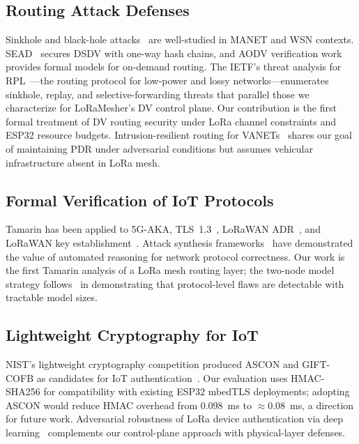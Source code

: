 \documentclass[10pt,journal,compsoc]{IEEEtran}
\begin{document}
\subsection{Routing Attack Defenses}

Sinkhole and black-hole attacks~\cite{sejaphala2025-sinkhole-detection,
ieee2025-blackhole-optimization,klenze2021-forwarding}
are well-studied in MANET and WSN contexts.
SEAD~\cite{hu2002-sead} secures DSDV with one-way hash chains,
and AODV verification work~\cite{glabbeek2016-aodv-verification}
provides formal models for on-demand routing.
The IETF's threat analysis for RPL~\cite{ietf-rfc7416}—the routing
protocol for low-power and lossy networks—enumerates sinkhole,
replay, and selective-forwarding threats that parallel those we
characterize for LoRaMesher's DV control plane.
Our contribution is the first formal treatment of DV routing
security under LoRa channel constraints and ESP32 resource budgets.
Intrusion-resilient routing for VANETs~\cite{springer2026-vanet-routing}
shares our goal of maintaining PDR under adversarial conditions
but assumes vehicular infrastructure absent in LoRa mesh.

\subsection{Formal Verification of IoT Protocols}

Tamarin has been applied to 5G-AKA, TLS~1.3~\cite{basin2025-tamarin-book},
LoRaWAN ADR~\cite{ieee2025-adr-eventb}, and LoRaWAN
key establishment~\cite{ieee2025-lorawan-key-verification}.
Attack synthesis frameworks~\cite{vonhippel2024-verification-attack,pereira2025-router-verification,song2026-protocolguard}
have demonstrated the value of automated reasoning for
network protocol correctness.
Our work is the first Tamarin analysis of a LoRa mesh routing
layer; the two-node model strategy follows~\cite{ieee2025-kang-tamarin,
shen2026-wifi-security} in demonstrating that
protocol-level flaws are detectable with tractable model sizes.

\subsection{Lightweight Cryptography for IoT}

NIST's lightweight cryptography competition produced ASCON and
GIFT-COFB as candidates for IoT authentication~\cite{ieee2025-lorawan-aes-crypto}.
Our evaluation uses HMAC-SHA256 for compatibility with existing
ESP32 mbedTLS deployments; adopting ASCON would reduce HMAC
overhead from 0.098~ms to $\approx$0.08~ms, a direction for
future work. Adversarial robustness of LoRa device
authentication via deep learning~\cite{ieee2025-lora-adversarial}
complements our control-plane approach with physical-layer defenses.
\end{document}
